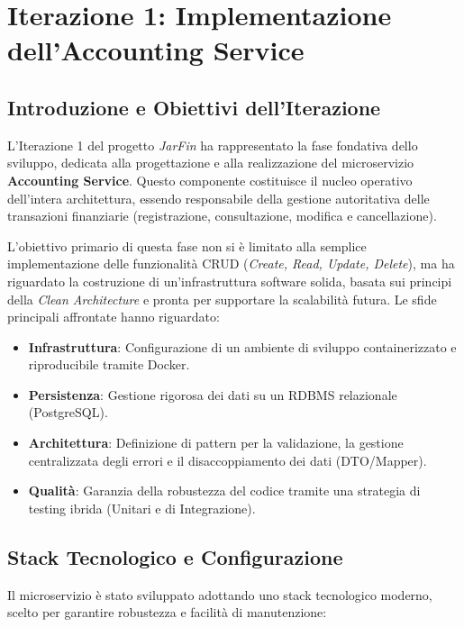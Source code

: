 \chapter{Iterazione 1: Implementazione dell'Accounting Service}
\label{chap:iterazione1}

\section{Introduzione e Obiettivi dell'Iterazione}

L'Iterazione 1 del progetto \textit{JarFin} ha rappresentato la fase fondativa dello sviluppo, dedicata alla progettazione e alla realizzazione del microservizio \textbf{Accounting Service}. Questo componente costituisce il nucleo operativo dell'intera architettura, essendo responsabile della gestione autoritativa delle transazioni finanziarie (registrazione, consultazione, modifica e cancellazione).

L'obiettivo primario di questa fase non si è limitato alla semplice implementazione delle funzionalità CRUD (\textit{Create, Read, Update, Delete}), ma ha riguardato la costruzione di un'infrastruttura software solida, basata sui principi della \textit{Clean Architecture} e pronta per supportare la scalabilità futura.
Le sfide principali affrontate hanno riguardato:

\begin{itemize}
    \item \textbf{Infrastruttura}: Configurazione di un ambiente di sviluppo containerizzato e riproducibile tramite Docker.
    \item \textbf{Persistenza}: Gestione rigorosa dei dati su un RDBMS relazionale (PostgreSQL).
    \item \textbf{Architettura}: Definizione di pattern per la validazione, la gestione centralizzata degli errori e il disaccoppiamento dei dati (DTO/Mapper).
    \item \textbf{Qualità}: Garanzia della robustezza del codice tramite una strategia di testing ibrida (Unitari e di Integrazione).
\end{itemize}

\section{Stack Tecnologico e Configurazione}

Il microservizio è stato sviluppato adottando uno stack tecnologico moderno, scelto per garantire robustezza e facilità di manutenzione:


